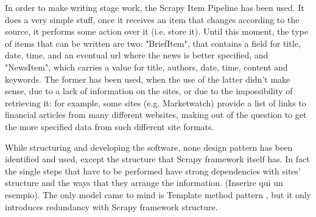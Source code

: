 In order to make writing stage work, the Scrapy Item Pipeline \cite{scrapypipeline} has been used. It does a very simple stuff, once it receives an item that changes according to the source, it performs some action over it (i.e. store it). Until this moment, the type of items that can be written are two: "BriefItem", that contains a field for title, date, time, and an eventual url where the news is better specified, and "NewsItem", which carries a value for title, authors, date, time, content and keywords. The former has been used, when the use of the latter didn't make sense, due to a lack of information on the sites, or due to the impossibility of retrieving it: for example, some sites (e.g. Marketwatch) provide a list of links to financial articles from many different websites, making out of the question to get the more specified data from such different site formats.   
\par While structuring and developing the software, none design pattern has been identified and used, except the structure that Scrapy framework itself has. In fact the single steps that have to be performed have strong dependencies with sites' structure and the ways that they arrange the information. (Inserire qui un esempio). The only model came to mind is Template method pattern \cite{templatepattern}, but it only introduces redundancy with Scrapy framework structure. 


